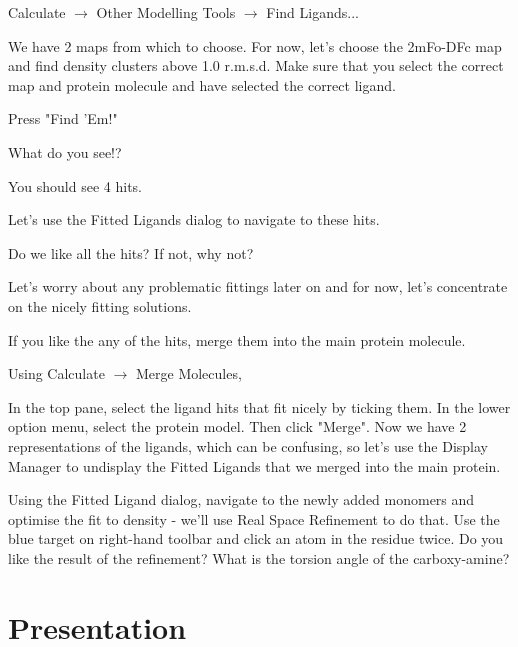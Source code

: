 \documentclass{article}
\begin{document}
 \textsf{Calculate $\rightarrow$ Other Modelling Tools $\rightarrow$ Find Ligands...}

 We have 2 maps from which to choose.  For now, let's choose the
 2mFo-DFc map and find density clusters above 1.0 r.m.s.d.  Make sure
 that you select the correct map and protein molecule and have
 selected the correct ligand.

 Press \textsf{"Find 'Em!"}

 \begin{trivlist}
 \item What do you see!? 

\textsf{You should see 4 hits.  }
 \end{trivlist}




Let's use the Fitted Ligands dialog to navigate to these hits.

\begin{trivlist}
\item Do we like all the hits?  If not, why not?  

\textsf{Let's worry about any problematic fittings later on and for
 now, let's concentrate on the nicely fitting solutions.}
\end{trivlist}


\begin{trivlist}
\item If you like the any of the hits, merge them into the main
  protein molecule.

Using \textsf{Calculate $\rightarrow$ Merge Molecules}, 

\end{trivlist}

 In the top pane, select the ligand hits that fit nicely by ticking
 them.  In the lower option menu, select the protein model.  Then
 click "Merge".  Now we have 2 representations of the ligands, which
 can be confusing, so let's use the Display Manager to undisplay the
 Fitted Ligands that we merged into the main protein.

 Using the Fitted Ligand dialog, navigate to the newly added monomers
 and optimise the fit to density - we'll use Real Space Refinement to
 do that.  Use the blue target on right-hand toolbar and click an atom
 in the residue twice.  Do you like the result of the refinement?
 What is the torsion angle of the carboxy-amine?

\section{Presentation}
\end{document}
